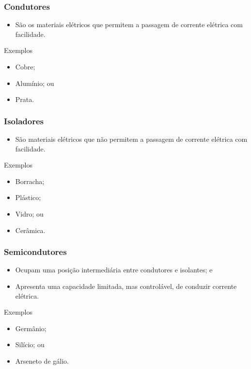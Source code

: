 \documentclass[aspectratio=169]{beamer} %
\begin{document}
\begin{frame}
	\frametitle{Condutores}
	
	\begin{itemize}
		\item São os materiais elétricos que permitem a passagem de corrente elétrica com facilidade. 
	\end{itemize}\vfill
	
	\begin{exampleblock}{Exemplos}
		\begin{itemize}
			\item Cobre;
			\item Alumínio; ou
			\item Prata.
		\end{itemize}
	\end{exampleblock}
\end{frame}

\begin{frame}
	\frametitle{Isoladores}
	
	\begin{itemize}
		\item São materiais elétricos que não permitem a passagem de corrente elétrica com facilidade.
	\end{itemize}\vfill
	
	\begin{exampleblock}{Exemplos}
		\begin{itemize}
			\item Borracha;
			\item Plástico;
			\item Vidro; ou
			\item Cerâmica.
		\end{itemize}
	\end{exampleblock}
\end{frame}

\begin{frame}
	\frametitle{Semicondutores}
	
	\begin{itemize}
		\item Ocupam uma posição intermediária entre condutores e isolantes; e
		\item Apresenta uma capacidade limitada, mas controlável, de conduzir corrente elétrica.
	\end{itemize}\vfill
	
	\begin{exampleblock}{Exemplos}
		\begin{itemize}
			\item Germânio;
			\item Silício; ou
			\item Arseneto de gálio.
		\end{itemize}
	\end{exampleblock}
\end{frame}
\end{document}

